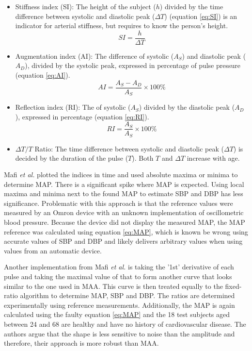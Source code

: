 \begin{itemize}

\item Stiffness index (SI): The height of the subject ($h$) divided by the time difference between systolic and diastolic peak ($\Delta T$) (equation \ref{eq:SI}) is an indicator for arterial stiffness, but requires to know the person's height.
\begin{equation}
\label{eq:SI}
SI=\frac{h}{\Delta T}
\end{equation}

\item Augmentation index (AI): The difference of systolic ($A_S$) and diastolic peak ($A_D$), divided by the systolic peak, expressed in percentage of pulse pressure (equation \ref{eq:AI}).
\begin{equation}
\label{eq:AI}
AI=\frac{A_S-A_D}{A_S}\times100\%
\end{equation}


\item Reflection index (RI): The of systolic ($A_S$) divided by the diastolic peak ($A_D$), expressed in percentage (equation \ref{eq:RI}).
\begin{equation}
\label{eq:RI}
RI=\frac{A_S}{A_S}\times100\%
\end{equation}



\item $\Delta T/T$ Ratio: The time difference between systolic and diastolic peak ($\Delta T$) is decided by the duration of the pulse ($T$). Both $T$ and $\Delta T$ increase with age.

\end{itemize}

Mafi \textit{et al.}\cite{Mafi2011} plotted the indices in time and used absolute maxima or minima to determine MAP. There is a significant spike where MAP is expected. Using local maxima and minima next to the found MAP to estimate SBP and DBP has less significance. Problematic with this approach is that the reference values were measured by an Omron device with an unknown implementation of oscillometric blood pressure. Because the device did not display the measured MAP, the MAP reference was calculated using equation \ref{eq:MAP}, which is known be wrong using accurate values of SBP and DBP and likely delivers arbitrary values when using values from an automatic device.

Another implementation from Mafi \textit{et al.}\cite{Mafi2012} is taking the '1st' derivative of each pulse and taking the maximal value of that to form another curve that looks similar to the one used in MAA. This curve is then treated equally to the fixed-ratio algorithm to determine MAP, SBP and DBP. The ratios are determined experimentally using reference measurements. Additionally, the MAP is again calculated using the faulty equation \ref{eq:MAP} and the 18 test subjects aged between 24 and 68 are healthy and have no history of cardiovascular disease. The authors argue that the shape is less sensitive to noise than the amplitude and therefore, their approach is more robust than MAA.
 

